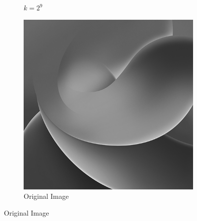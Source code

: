 \begin{figure}[H]
\begin{subfigure}[b]{0.3\textwidth}
        \caption{$k = 2^9$}
    \end{subfigure}
    \hfill
    \begin{subfigure}[b]{0.3\textwidth}
        \centering
        \includegraphics[width=\textwidth]{problem2/low_freq.bmp}
        \caption{Original Image}
    \end{subfigure}
\end{figure}
\pagebreak
